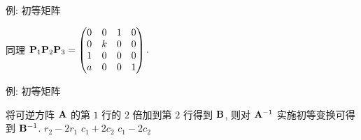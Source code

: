 \begin{frame}{例: 初等矩阵}
	\onslide<+->
	\begin{solutionc}
		同理 ${\mathbf{P}}_1{\mathbf{P}}_2{\mathbf{P}}_3=\begin{pmatrix}
			0&0&1&0\\
			0&k&0&0\\
			1&0&0&0\\
			a&0&0&1
		\end{pmatrix}.$

		\onslide<+->{%
		\[(\bfP_1\bfP_2\bfP_3)^{-1}=\bfP_3^{-1}\bfP_2^{-1}\bfP_1^{-1}=\begin{pmatrix}
			0&0&1&0\\
			0&1/k&0&0\\
			1&0&0&0\\
			0&0&-a&1
		\end{pmatrix}.\]}
		\vspace{-\baselineskip}
	\end{solutionc}
\end{frame}


\begin{frame}{例: 初等矩阵}
	\onslide<+->
	\begin{exercise}
		将可逆方阵 ${\mathbf{A}}$ 的第 $1$ 行的 $2$ 倍加到第 $2$ 行得到 ${\mathbf{B}}$, 则对 ${\mathbf{A}}^{-1}$ 实施初等变换可得到 ${\mathbf{B}}^{-1}$.
		{$r_2-2r_1$}%
		{$c_1+2c_2$}%
		{$c_1-2c_2$}
	\end{exercise}
\end{frame}

